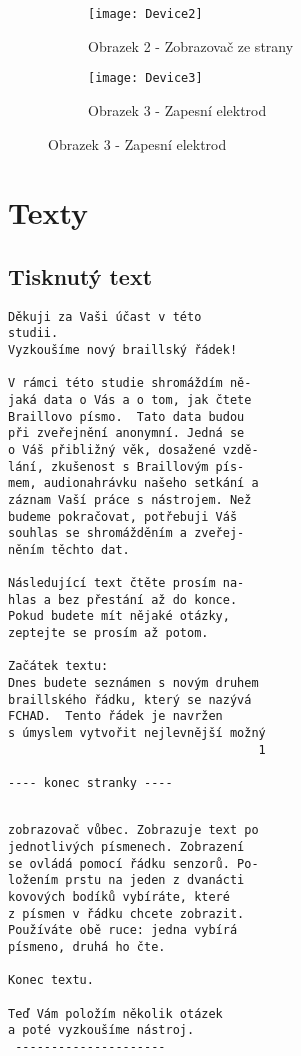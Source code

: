 \begin{figure}
\centering
\begin{subfigure}{.5\textwidth}
  \centering
  \texttt{[image: Device2]}
  \caption{Obrazek 2 - Zobrazovač ze strany}
  \label{fig:sub1}
\end{subfigure}%
\begin{subfigure}{.5\textwidth}
  \centering
  \texttt{[image: Device3]}
  \caption{Obrazek 3 - Zapesní elektrod}
  \label{fig:sub2}
\end{subfigure}
\label{fig:test}
\end{figure}


\clearpage

\section{Texty}
\subsection{Tisknutý text}
\begin{verbatim}
Děkuji za Vaši účast v této
studii.
Vyzkoušíme nový braillský řádek!

V rámci této studie shromáždím ně-
jaká data o Vás a o tom, jak čtete
Braillovo písmo.  Tato data budou
při zveřejnění anonymní. Jedná se
o Váš přibližný věk, dosažené vzdě-
lání, zkušenost s Braillovým pís-
mem, audionahrávku našeho setkání a
záznam Vaší práce s nástrojem. Než
budeme pokračovat, potřebuji Váš
souhlas se shromážděním a zveřej-
něním těchto dat.

Následující text čtěte prosím na-
hlas a bez přestání až do konce.
Pokud budete mít nějaké otázky,
zeptejte se prosím až potom.

Začátek textu:
Dnes budete seznámen s novým druhem
braillského řádku, který se nazývá
FCHAD.  Tento řádek je navržen
s úmyslem vytvořit nejlevnější možný
                                   1

---- konec stranky ----
\end{verbatim}
\clearpage
\begin{verbatim}

zobrazovač vůbec. Zobrazuje text po
jednotlivých písmenech. Zobrazení
se ovládá pomocí řádku senzorů. Po-
ložením prstu na jeden z dvanácti
kovových bodíků vybíráte, které
z písmen v řádku chcete zobrazit.
Používáte obě ruce: jedna vybírá
písmeno, druhá ho čte.

Konec textu.

Teď Vám položím několik otázek
a poté vyzkoušíme nástroj.
 ---------------------
\end{verbatim}
\clearpage
